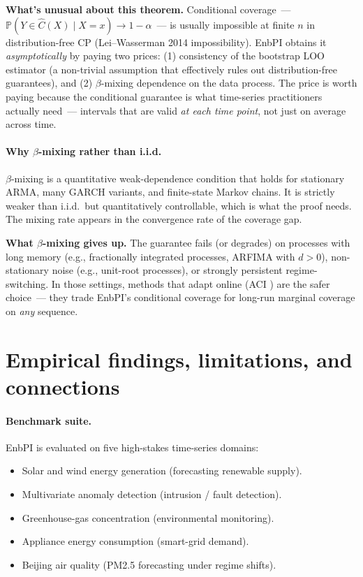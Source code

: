 \documentclass[letterpaper,11pt,leqno]{article}
\begin{document}
\begin{theoremexplain}
\textbf{What's unusual about this theorem.} Conditional coverage~--- $\mathbb{P}(Y \in \hat{C}(X) \mid X = x) \to 1-\alpha$~--- is usually impossible at finite $n$ in distribution-free CP (Lei--Wasserman 2014 impossibility). EnbPI obtains it \emph{asymptotically} by paying two prices: (1) consistency of the bootstrap LOO estimator (a non-trivial assumption that effectively rules out distribution-free guarantees), and (2) $\beta$-mixing dependence on the data process. The price is worth paying because the conditional guarantee is what time-series practitioners actually need~--- intervals that are valid \emph{at each time point}, not just on average across time.
\end{theoremexplain}

\paragraph{Why $\beta$-mixing rather than i.i.d.} $\beta$-mixing is a quantitative weak-dependence condition that holds for stationary ARMA, many GARCH variants, and finite-state Markov chains. It is strictly weaker than i.i.d.~but quantitatively controllable, which is what the proof needs. The mixing rate appears in the convergence rate of the coverage gap.

\begin{assumptionexplain}
\textbf{What $\beta$-mixing gives up.} The guarantee fails (or degrades) on processes with long memory (e.g., fractionally integrated processes, ARFIMA with $d > 0$), non-stationary noise (e.g., unit-root processes), or strongly persistent regime-switching. In those settings, methods that adapt online (ACI \cite{gibbs2021aci, zaffran2022aci}) are the safer choice~--- they trade EnbPI's conditional coverage for long-run marginal coverage on \emph{any} sequence.
\end{assumptionexplain}

\section{Empirical findings, limitations, and connections}\label{s:empirics}

\paragraph{Benchmark suite.} EnbPI is evaluated on five high-stakes time-series domains:
\begin{itemize}
\item Solar and wind energy generation (forecasting renewable supply).
\item Multivariate anomaly detection (intrusion / fault detection).
\item Greenhouse-gas concentration (environmental monitoring).
\item Appliance energy consumption (smart-grid demand).
\item Beijing air quality (PM2.5 forecasting under regime shifts).
\end{itemize}
\end{document}
